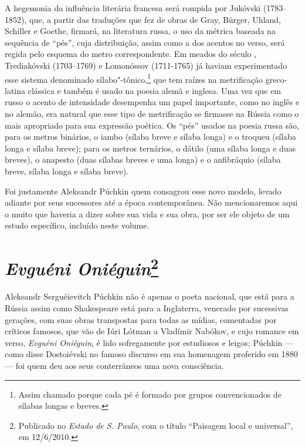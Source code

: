 A hegemonia da influência literária francesa será rompida por Jukóvski (1783--1852),
que, a partir das traduções que fez de obras de Gray, Bürger, Uhland,
Schiller e Goethe, firmará, na literatura russa, o uso da métrica baseada
na sequência de ``pés'', cuja distribuição, assim como a dos
acentos no verso, será regida pelo esquema do metro correspondente. Em
meados do século , Trediakóvski (1703--1769)
e Lomonóssov (1711-1765) já haviam
experimentado esse sistema denomina­do sílabo"-tônico,\footnote{Assim chamado porque cada pé é formado por grupos convencionados de sílabas longas e breves.} que tem raízes na
metrificação greco-latina clássica e tam­bém é usado na poesia alemã e
inglesa. Uma vez que em russo o acento de intensidade desempenha um
papel importante, como no inglês e no alemão, era natural que esse tipo
de metrificação se firmasse na Rússia como o mais apropriado para
sua expressão poética. Os ``pés'' usados na poesia russa são, para os
metros binários, o iambo (sílaba breve e sílaba longa) e o troqueu
(sílaba longa e sílaba breve); para os metros ternários, o dátilo (uma
sílaba lon­ga e duas breves), o anapesto (duas sílabas breves e uma
longa) e o anfibráquio (sílaba breve, sílaba longa e sílaba breve).

Foi justamente Aleksandr Púchkin quem consagrou esse novo modelo, levado
adiante por seus sucessores até a época contemporânea. Não mencionaremos
aqui o muito que haveria a dizer sobre sua vida e sua obra, por ser ele
objeto de um estudo específico, incluído neste volume.

\chapter{\emph{Evguéni Oniéguin}\footnote{Publicado no \emph{Estado de S. Paulo}, com o título ``Paisagem local e universal'', em 12/6/2010.}}
\label{puchkin2}

Aleksandr Serguéievitch Púchkin não é apenas o poeta nacional, que está
para a Rússia assim como Shakespeare está para a Inglaterra, venerado
por sucessivas gerações, com suas obras transpostas para todas as
mídias, comentadas por críticos famosos, que vão de Iúri Lótman a
Vladímir Nabókov, e cujo romance em verso, \emph{Evguéni Oniéguin}, é lido
sofregamente por estudiosos e leigos; Púchkin --- como disse
Dostoiévski no famoso discurso em sua homenagem proferido em 1880 --- foi quem deu aos seus conterrâneos uma nova consciência.

